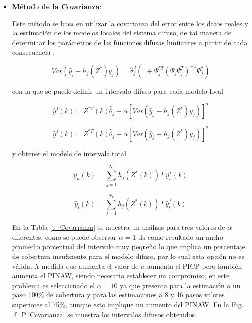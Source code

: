 \documentclass[12pt]{article}
\begin{document}
\begin{itemize}
\item \textbf{Método de la Covarianza}:

Este método se basa en utilizar la covarianza del error entre los datos reales y la
estimación de los modelos locales del sistema difuso, de tal manera de determinar los
parámetros de las funciones difusas limitantes a partir de cada consecuencia \citep{skrjanc_confidence_2009,skrjanc_fuzzy_2011}.

\begin{equation}
Var(\hat{y}_j-h_j(Z^*)y_j)=\hat{\sigma}_j^2(1+\Psi_j^{*T}(\Psi_j\Psi_j^T)^{-1}\Psi_j^*)
\label{e_Varianza}
\end{equation}

con la que se puede definir un intervalo difuso para cada modelo local

\begin{equation}
\hat{y}^j(k)=Z^{*T}(k)\hat{\theta}_j+\alpha[Var(\hat{y}_j-h_j(Z^*)y_j)]^2
\label{e_MLocal}
\end{equation}

\begin{equation}
\hat{y}^j(k)=Z^{*T}(k)\hat{\theta}_j-\alpha[Var(\hat{y}_j-h_j(Z^*)y_j)]^2
\label{e_MLocal2}
\end{equation}

y obtener el modelo de intervalo total

\begin{equation}
\hat{y}_{u}(k)=\sum_{j=1}^{N_r}h_j(Z^*(k))*\hat{y}_u^j(k)
\label{e_ModDifusoC}
\end{equation}

\begin{equation}
\hat{y}_{l}(k)=\sum_{j=1}^{N_r}h_j(Z^*(k))*\hat{y}_l^j(k)
\label{e_ModDifusoC1}
\end{equation}

En la Tabla \ref{t_Covarianza} se muestra un análisis para tres valores de $\alpha$ diferentes, como se puede observar $\alpha=1$ da como resultado un ancho promedio porcentual del intervalo muy pequeño lo que implica un porcentaje de cobertura insuficiente para el modelo difuso, por lo cual esta opción no es válida. A medida que aumenta el valor de $\alpha$ aumenta el PICP pero también aumenta el PINAW, siendo necesario establecer un compromiso, en este problema es seleccionado el $\alpha=10$ ya que presenta para la estimación a un paso 100\% de cobertura y para las estimaciones a 8 y 16 pasos valores superiores al 75\%, aunque esto implique un aumento del PINAW. En la Fig. \ref{f_P1Covarianza} se muestra los intervalos difusos obtenidos.


\end{itemize}
\end{document}

